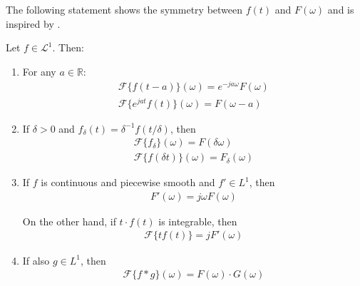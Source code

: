\noindent
The following statement shows the symmetry between $f(t)$ and $F(\omega)$ and is inspired by \cite{page 214, FAA}.

\begin{theorem} \label{theorem:fund_Fourier}
Let $f \in \mathcal{L}^1$. Then:

\begin{enumerate}[label=(\alph*)]
\item For any $a \in \mathbb{R}$:
\begin{align*}
\mathcal{F}\{f(t-a)\}(\omega) = e^{-ja\omega} F(\omega) \\
\mathcal{F}\{e^{jat}f(t)\}(\omega) = F(\omega - a)
\end{align*}

\item If $\delta > 0$ and $f_\delta(t)=\delta^{-1}f(t/\delta)$, then
\begin{align*}
\mathcal{F}\{f_\delta\}(\omega) = F(\delta\omega) \\
\mathcal{F}\{f(\delta t)\}(\omega) = F_\delta(\omega)
\end{align*}

\item If $f$ is continuous and piecewise smooth and $f' \in L^1$, then
\begin{align*}
F'(\omega) = j\omega F(\omega)
\end{align*}

On the other hand, if $t\cdot f(t)$ is integrable, then
\begin{align*}
\mathcal{F}\{tf(t)\} = j F'(\omega)
\end{align*}

\item If also $g \in L^1$, then
\begin{align*}
\mathcal{F}\{f*g\}(\omega) = F(\omega) \cdot G(\omega)
\end{align*}
\end{enumerate}
\end{theorem}

